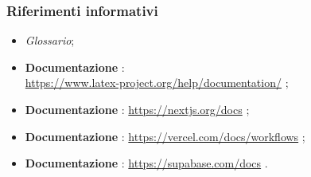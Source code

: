 \subsubsection{Riferimenti informativi}
\begin{itemize}
    \item \textit{Glossario};
    \item \textbf{Documentazione \term{\LaTeX}}:\\
    \url{https://www.latex-project.org/help/documentation/} ;
    \item \textbf{Documentazione }: \url{https://nextjs.org/docs} ;
    \item \textbf{Documentazione }: \url{https://vercel.com/docs/workflows} ;
    \item \textbf{Documentazione }: \url{https://supabase.com/docs} .
\end{itemize}